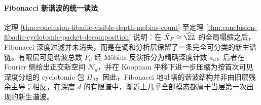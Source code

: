 \paragraph{Fibonacci 新谐波的统一读法}
定理 \ref{thm:conclusion-fibadic-visible-depth-mobius-count} 至定理 \ref{thm:conclusion-fibadic-cyclotomic-packet-decomposition} 说明：在 \(\widehat X_F\cong \widehat{\ZZ}\) 的全局塌缩之后，Fibonacci 深度过滤并未消失，而是在调和分析层保留了一条完全可分类的新生谱链。有限层可见谐波总数 \(F_d\) 经 Möbius 反演拆分为精确深度计数 \(a_d\)，后者在 Fourier 侧给出正交新空间 \(\mathcal N_d\)，并在 Koopman 平移下进一步压缩为按首次可见深度分组的 cyclotomic 包 \(\Pi_d\)。因此，Fibonacci 地址塔的谐波结构并非由旧层残余主导；相反，在深度 \(d\) 的有限谱中，渐近上几乎全部模态都属于当层第一次出现的新生谐波。

\endinput
